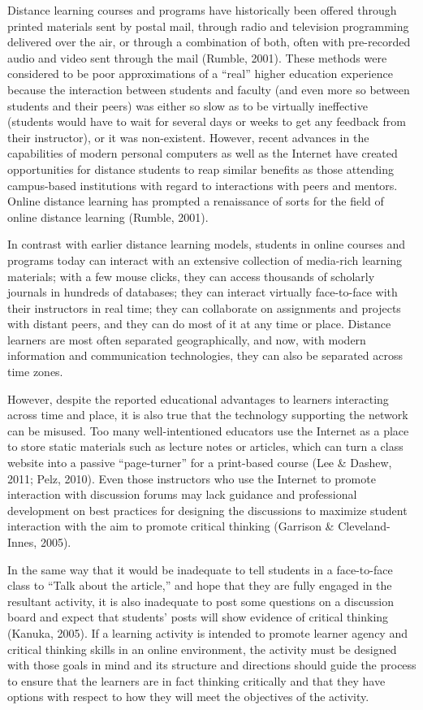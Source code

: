 \documentclass[
]{book}
\theoremstyle{definition}
\theoremstyle{definition}
\theoremstyle{definition}
\theoremstyle{definition}
\theoremstyle{remark}
\begin{document}
Distance learning courses and programs have historically been offered through printed materials sent by postal mail, through radio and television programming delivered over the air, or through a combination of both, often with pre-recorded audio and video sent through the mail (Rumble, 2001). These methods were considered to be poor approximations of a ``real'' higher education experience because the interaction between students and faculty (and even more so between students and their peers) was either so slow as to be virtually ineffective (students would have to wait for several days or weeks to get any feedback from their instructor), or it was non-existent. However, recent advances in the capabilities of modern personal computers as well as the Internet have created opportunities for distance students to reap similar benefits as those attending campus-based institutions with regard to interactions with peers and mentors. Online distance learning has prompted a renaissance of sorts for the field of online distance learning (Rumble, 2001).

In contrast with earlier distance learning models, students in online courses and programs today can interact with an extensive collection of media-rich learning materials; with a few mouse clicks, they can access thousands of scholarly journals in hundreds of databases; they can interact virtually face-to-face with their instructors in real time; they can collaborate on assignments and projects with distant peers, and they can do most of it at any time or place. Distance learners are most often separated geographically, and now, with modern information and communication technologies, they can also be separated across time zones.

However, despite the reported educational advantages to learners interacting across time and place, it is also true that the technology supporting the network can be misused. Too many well-intentioned educators use the Internet as a place to store static materials such as lecture notes or articles, which can turn a class website into a passive ``page-turner'' for a print-based course (Lee \& Dashew, 2011; Pelz, 2010). Even those instructors who use the Internet to promote interaction with discussion forums may lack guidance and professional development on best practices for designing the discussions to maximize student interaction with the aim to promote critical thinking (Garrison \& Cleveland-Innes, 2005).

In the same way that it would be inadequate to tell students in a face-to-face class to ``Talk about the article,'' and hope that they are fully engaged in the resultant activity, it is also inadequate to post some questions on a discussion board and expect that students' posts will show evidence of critical thinking (Kanuka, 2005). If a learning activity is intended to promote learner agency and critical thinking skills in an online environment, the activity must be designed with those goals in mind and its structure and directions should guide the process to ensure that the learners are in fact thinking critically and that they have options with respect to how they will meet the objectives of the activity.
\end{document}

